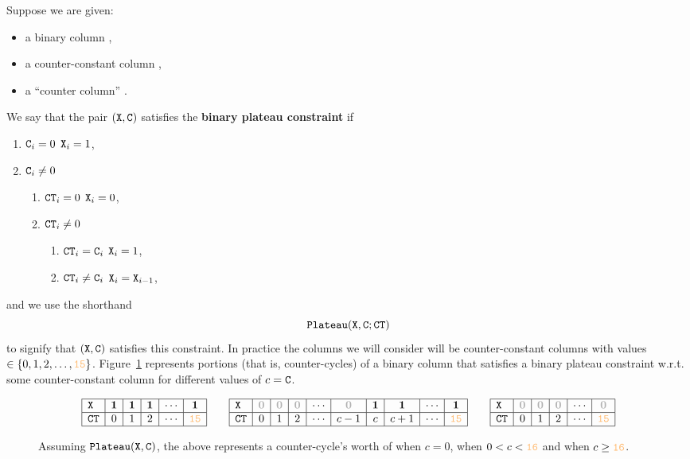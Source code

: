 Suppose we are given:
\begin{itemize}
	\item a binary column ,
	\item a counter-constant column ,
	\item a ``counter column'' \ct{}.
\end{itemize}
We say that the pair $(\texttt{X},\texttt{C})$ satisfies the \textbf{binary plateau constraint}\label{def: binary plateau constraints} if
\begin{enumerate}
	\item \If $\texttt{C}_i = 0$ \Then $\texttt{X}_i=1$,
	\item \If $\texttt{C}_i \neq 0$ \Then
	\begin{enumerate}
		\item \If $\texttt{CT}_i = 0$ \Then $\texttt{X}_i=0$,
		\item \If $\texttt{CT}_i \neq 0$ \Then 
		\begin{enumerate}
			\item \If $\texttt{CT}_{i} = \texttt{C}_{i}$ \Then $\texttt{X}_{i} = 1$,
			\item \If $\texttt{CT}_{i} \neq \texttt{C}_{i}$ \Then $\texttt{X}_{i} = \texttt{X}_{i - 1}$,
		\end{enumerate}
	\end{enumerate}
\end{enumerate}
and we use the shorthand
\[
	\texttt{Plateau}(\texttt{X},\texttt{C}; \texttt{CT}{})
\]
to signify that $(\texttt{X},\texttt{C})$ satisfies this constraint. In practice the columns  we will consider will be counter-constant columns with values $\in\{0,1,2,\dots,\llargeMO\}$. Figure~\ref{fig: binary plateau constraints} represents portions (that is, counter-cycles) of a binary column  that satisfies a binary plateau constraint w.r.t. some counter-constant column  for different values of $c=\texttt{C}$.
\def\zero{\bm{{\color{gray!60}0}}}
\def\one{\bm{1}}
\begin{figure}
\[
	\begin{array}{|l|c|c|c|c|c|c|c|c|c|}
	\hline
	\col{X} & \one & \one & \one & \cdots & \one\\
	\hline
	\ct{}   & 0 & 1 & 2 & \cdots & \llargeMO\\
	\hline
	\end{array}
	\qquad
	\begin{array}{|l|c|c|c|c|c|c|c|c|c|}
	\hline
	\col{X} & \zero & \zero & \zero & \cdots & \zero & \one & \one & \cdots & \one\\
	\hline
	\ct{}   & 0 & 1 & 2 & \cdots & c-1 & c & c+1 & \cdots & \llargeMO\\
	\hline
	\end{array}
	\qquad
	\begin{array}{|l|c|c|c|c|c|c|c|c|c|}
	\hline
	\col{X} & \zero & \zero & \zero & \cdots & \zero\\
	\hline
	\ct{}   & 0 & 1 & 2 & \cdots & \llargeMO\\
	\hline
	\end{array}
\]
\caption{Assuming $\texttt{Plateau}(\texttt{X},\texttt{C})$, the above represents a counter-cycle's worth of  when $c=0$, when $0 < c < \llarge$ and when $c\geq \llarge$.}
\label{fig: binary plateau constraints}
\end{figure}
